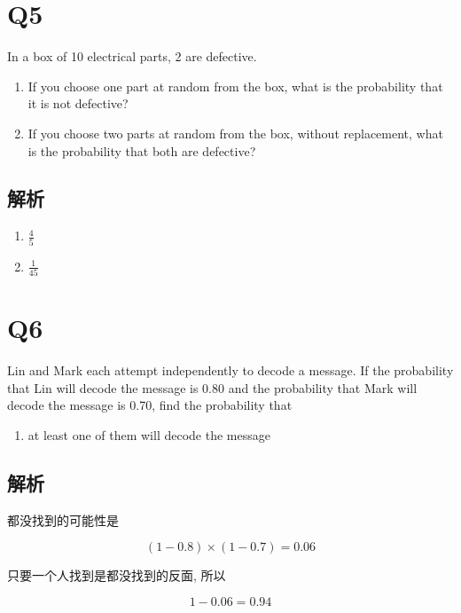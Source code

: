 \section{Q5}

  In a box of 10 electrical parts, 2 are defective.

  \begin{enumerate}
    \item If you choose one part at random from the box, what is the
    probability that it is not defective?
    \item If you choose two parts at random from the box, without replacement,
    what is the probability that both are defective?
  \end{enumerate}

  \subsection{解析}

    \begin{enumerate}
      \item $ \frac{4}{5} $
      \item $ \frac{1}{45} $
    \end{enumerate}

\section{Q6}

  Lin and Mark each attempt independently to decode a message.
  If the probability that Lin will decode the message is 0.80 and the
  probability that Mark will decode the message is 0.70,
  find the probability that

  \begin{enumerate}
    \item at least one of them will decode the message
  \end{enumerate}

  \subsection{解析}

    都没找到的可能性是

    \begin{equation*}
      \left( 1 - 0.8 \right) \times \left( 1 - 0.7 \right) = 0.06
    \end{equation*}

    只要一个人找到是都没找到的反面, 所以

    \begin{equation*}
      1 - 0.06 = 0.94
    \end{equation*}
